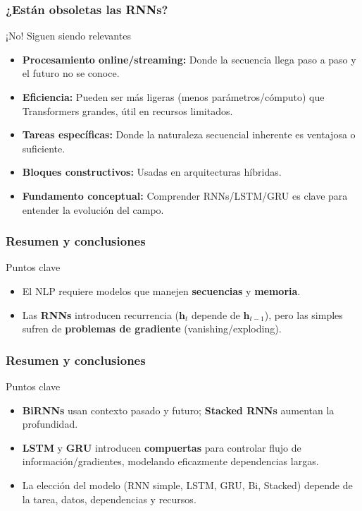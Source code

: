\documentclass[handout]{beamer}
\newcommand{\vect}[1]{\mathbf{#1}} %
\begin{document}
\begin{frame}
    \frametitle{¿Están obsoletas las RNNs?}
    \begin{block}{¡No! Siguen siendo relevantes}
                \begin{itemize}
                    \item \textbf{Procesamiento online/streaming:} Donde la secuencia llega paso a paso y el futuro no se conoce.
                    \item \textbf{Eficiencia:} Pueden ser más ligeras (menos parámetros/cómputo) que Transformers grandes, útil en recursos limitados.
                    \item \textbf{Tareas específicas:} Donde la naturaleza secuencial inherente es ventajosa o suficiente.
                    \item \textbf{Bloques constructivos:} Usadas en arquitecturas híbridas.
                    \item \textbf{Fundamento conceptual:} Comprender RNNs/LSTM/GRU es clave para entender la evolución del campo.
                \end{itemize}
    \end{block}
\end{frame}

\begin{frame}
    \frametitle{Resumen y conclusiones}
    \begin{block}{Puntos clave}
        \begin{itemize}
            \item El NLP requiere modelos que manejen \textbf{secuencias} y \textbf{memoria}.
            \item Las \textbf{RNNs} introducen recurrencia ($\vect{h}_t$ depende de $\vect{h}_{t-1}$), pero las simples sufren de \textbf{problemas de gradiente} (vanishing/exploding).
        \end{itemize}
    \end{block}
\end{frame}

\begin{frame}
    \frametitle{Resumen y conclusiones}
    \begin{block}{Puntos clave}
        \begin{itemize}
            \item \textbf{BiRNNs} usan contexto pasado y futuro; \textbf{Stacked RNNs} aumentan la profundidad.
            \item \textbf{LSTM} y \textbf{GRU} introducen \textbf{compuertas} para controlar flujo de información/gradientes, modelando eficazmente dependencias largas.
            \item La elección del modelo (RNN simple, LSTM, GRU, Bi, Stacked) depende de la tarea, datos, dependencias y recursos.
        \end{itemize}
    \end{block}
\end{frame}
\end{document}
